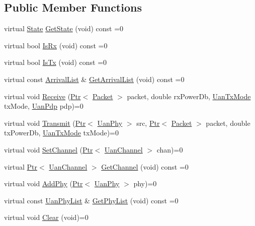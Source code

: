 \subsection*{Public Member Functions}
\begin{DoxyCompactItemize}
\item 
virtual \hyperlink{classns3_1_1UanTransducer_a037314c27ca07c9c6234460086058bce}{State} \hyperlink{classns3_1_1UanTransducer_a60d04ffb8ad841f17fe34f2f2e318225}{Get\+State} (void) const =0
\item 
virtual bool \hyperlink{classns3_1_1UanTransducer_a16e639eb76394f9758dc1a7f93c040d6}{Is\+Rx} (void) const =0
\item 
virtual bool \hyperlink{classns3_1_1UanTransducer_a01638a0917d5b7a6979a89d9ec6abb01}{Is\+Tx} (void) const =0
\item 
virtual const \hyperlink{classns3_1_1UanTransducer_a95332a21e30506421a116d4b5c4dfd75}{Arrival\+List} \& \hyperlink{classns3_1_1UanTransducer_abea41a12264ee2f6560ed8227b48cd34}{Get\+Arrival\+List} (void) const =0
\item 
virtual void \hyperlink{classns3_1_1UanTransducer_aa6682b6778b11d03ce6e3ab504046c0d}{Receive} (\hyperlink{classns3_1_1Ptr}{Ptr}$<$ \hyperlink{classns3_1_1Packet}{Packet} $>$ packet, double rx\+Power\+Db, \hyperlink{classns3_1_1UanTxMode}{Uan\+Tx\+Mode} tx\+Mode, \hyperlink{classns3_1_1UanPdp}{Uan\+Pdp} pdp)=0
\item 
virtual void \hyperlink{classns3_1_1UanTransducer_ab0b3226e7a0ed3127c1dda3ffab6d6ee}{Transmit} (\hyperlink{classns3_1_1Ptr}{Ptr}$<$ \hyperlink{classns3_1_1UanPhy}{Uan\+Phy} $>$ src, \hyperlink{classns3_1_1Ptr}{Ptr}$<$ \hyperlink{classns3_1_1Packet}{Packet} $>$ packet, double tx\+Power\+Db, \hyperlink{classns3_1_1UanTxMode}{Uan\+Tx\+Mode} tx\+Mode)=0
\item 
virtual void \hyperlink{classns3_1_1UanTransducer_acf9abb0587f6a19294dec03946b84d49}{Set\+Channel} (\hyperlink{classns3_1_1Ptr}{Ptr}$<$ \hyperlink{classns3_1_1UanChannel}{Uan\+Channel} $>$ chan)=0
\item 
virtual \hyperlink{classns3_1_1Ptr}{Ptr}$<$ \hyperlink{classns3_1_1UanChannel}{Uan\+Channel} $>$ \hyperlink{classns3_1_1UanTransducer_adbcc904bddbcc338ab2f6c7ca1772bd9}{Get\+Channel} (void) const =0
\item 
virtual void \hyperlink{classns3_1_1UanTransducer_a25db94a2c61c654b3e4105c91978a4fe}{Add\+Phy} (\hyperlink{classns3_1_1Ptr}{Ptr}$<$ \hyperlink{classns3_1_1UanPhy}{Uan\+Phy} $>$ phy)=0
\item 
virtual const \hyperlink{classns3_1_1UanTransducer_a3bac0e2447ad40f48533d14b10d01212}{Uan\+Phy\+List} \& \hyperlink{classns3_1_1UanTransducer_a1cbd81e29b37a0f7b9fae3e597f1d09d}{Get\+Phy\+List} (void) const =0
\item 
virtual void \hyperlink{classns3_1_1UanTransducer_af3034fc85ca12fa3d7e0e17224a1c631}{Clear} (void)=0
\end{DoxyCompactItemize}
